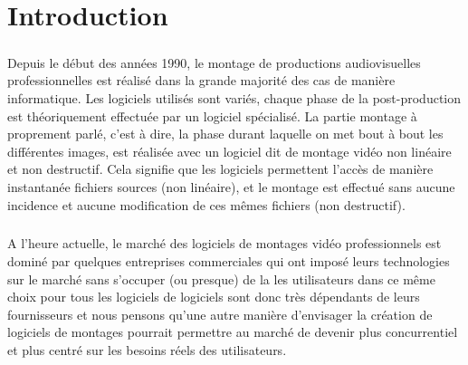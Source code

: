 








\setcounter{page}{1} \newpage \chapter*{Introduction}

\paragraph{}

Depuis le début des années 1990, le montage de
productions audiovisuelles professionnelles est réalisé dans la grande
majorité des cas de manière informatique. Les logiciels utilisés
sont variés, chaque phase de la post-production est théoriquement
effectuée par un logiciel spécialisé. La partie montage à proprement
parlé, c'est à dire, la phase durant laquelle on met bout à bout
les différentes images, est réalisée avec un logiciel dit de montage
vidéo non linéaire et non destructif. Cela signifie que les logiciels
permettent l'accès de manière instantanée %
fichiers sources (non linéaire), et le montage est effectué sans aucune
incidence et aucune modification de ces mêmes fichiers (non destructif).

\paragraph{}

A l'heure actuelle, le marché des logiciels de montages vidéo
professionnels est dominé par quelques entreprises commerciales qui ont
imposé leurs technologies sur le marché sans s'occuper (ou presque)
de la %
les utilisateurs %
dans ce même choix pour tous les logiciels %
de logiciels sont donc très dépendants de leurs fournisseurs et nous
pensons qu'une autre manière d'envisager la création de logiciels de
montages pourrait permettre au marché de devenir plus concurrentiel et
plus centré sur les besoins réels des utilisateurs.

